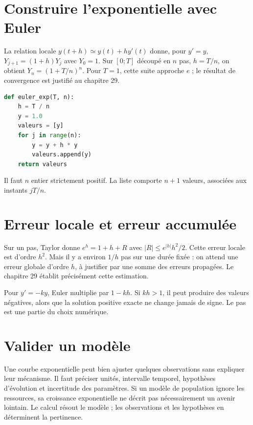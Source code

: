 \documentclass[../cours_1re.tex]{subfiles}
\begin{document}
\section{Construire l'exponentielle avec Euler}
La relation locale $y(t+h)\simeq y(t)+hy'(t)$ donne, pour $y'=y$,
$Y_{j+1}=(1+h)Y_j$ avec $Y_0=1$.
Sur $[0;T]$ découpé en $n$ pas, $h=T/n$, on obtient
$Y_n=(1+T/n)^n$. Pour $T=1$, cette suite approche $e$ ; le résultat de convergence est justifié au chapitre 29.
\begin{lstlisting}[language=Python]
def euler_exp(T, n):
    h = T / n
    y = 1.0
    valeurs = [y]
    for j in range(n):
        y = y + h * y
        valeurs.append(y)
    return valeurs
\end{lstlisting}
Il faut $n$ entier strictement positif. La liste comporte $n+1$ valeurs, associées aux instants $jT/n$.
\begin{center}\end{center}
\section{Erreur locale et erreur accumulée}
Sur un pas, Taylor donne $e^h=1+h+R$ avec $|R|\le e^{|h|}h^2/2$.
Cette erreur locale est d'ordre $h^2$. Mais il y a environ $1/h$ pas sur une durée fixée : on attend une erreur globale d'ordre $h$, à justifier par une somme des erreurs propagées.
Le chapitre 29 établit précisément cette estimation.
\begin{attention}
Pour $y'=-ky$, Euler multiplie par $1-kh$. Si $kh>1$, il peut produire des valeurs négatives, alors que la solution positive exacte ne change jamais de signe. Le pas est une partie du choix numérique.
\end{attention}
\section{Valider un modèle}
Une courbe exponentielle peut bien ajuster quelques observations sans expliquer leur mécanisme. Il faut préciser unités, intervalle temporel, hypothèses d'évolution et incertitude des paramètres.
Si un modèle de population ignore les ressources, sa croissance exponentielle ne décrit pas nécessairement un avenir lointain. Le calcul résout le modèle ; les observations et les hypothèses en déterminent la pertinence.
\end{document}
